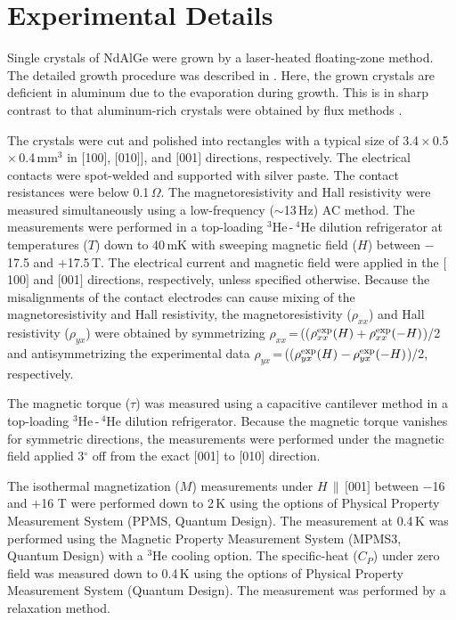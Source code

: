 \documentclass[%
preprint,
 amsmath,amssymb,
 aps,
]{revtex4-2}
\begin{document}
\section{Experimental Details}

%
Single crystals of NdAlGe were grown by a laser-heated floating-zone method. 
%
The detailed growth procedure was described in \cite{Kikugawa_inorganics_2023}. 
%
Here, the grown crystals are deficient in aluminum due to the evaporation during growth. 
%
This is in sharp contrast to that aluminum-rich crystals were obtained by flux methods 
\cite{Zhao_NewJPhys_2022,Yang_PhysRevMater_2023,Cho_SSRN_2022,Dhital_PhyrevB_2023}. 
%

%
The crystals were cut and polished into rectangles with a typical size of 
3.4\,$\times$\,0.5\,$\times$\,0.4\,mm$^{3}$ in 
$\lbrack$100$\rbrack$, $\lbrack$010$\rbrack$], and $\lbrack$001$\rbrack$ directions, respectively. 
%
The electrical contacts were spot-welded and supported with silver paste. 
%
The contact resistances were below 0.1\,$\Omega$. 
%
The magnetoresistivity and Hall resistivity were measured simultaneously using a low-frequency 
($\sim$13\,Hz) AC method. 
%
The measurements were performed in a top-loading $^{3}$He\,-\,$^{4}$He dilution refrigerator 
at temperatures ($T$) down to 40\,mK with sweeping magnetic field ($H$) between $-$17.5 
and $+$17.5\,T. 
%
The electrical current and magnetic field were applied in the $\lbrack$100$\rbrack$ 
and $\lbrack$001$\rbrack$ directions, respectively, unless specified otherwise. 
%
Because the misalignments of the contact electrodes can cause mixing of the magnetoresistivity and Hall resistivity, the magnetoresistivity ($\rho_{xx}$) and Hall resistivity ($\rho_{yx}$) were obtained by 
symmetrizing $\rho_{xx}$\,=\,(($\rho_{xx}^{\rm exp}(H)$\,$+$\,$\rho_{xx}^{\rm exp}(-H)$)/2 and 
antisymmetrizing the experimental data 
$\rho_{yx}$\,=\,(($\rho_{yx}^{\rm exp}(H)$\,$-$\,$\rho_{yx}^{\rm exp}(-H)$)/2, respectively. 
%

%
The magnetic torque ($\tau$) was measured using a capacitive cantilever method 
in a top-loading $^{3}$He\,-\,$^{4}$He dilution refrigerator. 
%
Because the magnetic torque vanishes for symmetric directions, the measurements were performed 
under the magnetic field applied 3$^{\circ}$ off from the exact $\lbrack$001$\rbrack$ 
to $\lbrack$010$\rbrack$ direction. 
%

%
The isothermal magnetization ($M$) measurements under 
$H$\,$\parallel$\,$\lbrack$001$\rbrack$ between $-$16 and $+$16 T were performed down to 2\,K 
using the options of Physical Property Measurement System (PPMS, Quantum Design). 
%
The measurement at 0.4\,K was performed using the Magnetic Property Measurement System 
(MPMS3, Quantum Design) with a $^{3}$He cooling option. 
%
The specific-heat ($C_{P}$) under zero field was measured down to 0.4\,K 
using the options of Physical Property Measurement System (Quantum Design). 
%
The measurement was performed by a relaxation method. 
%
\end{document}
